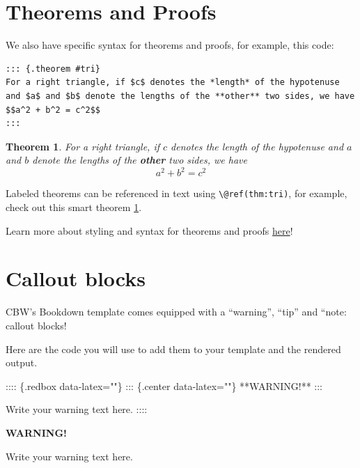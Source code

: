 \documentclass[
]{book}
\newenvironment{Shaded}{\begin{snugshade}}{\end{snugshade}}
\newcommand{\NormalTok}[1]{#1}
\newenvironment{redbox}{
  \definecolor{shadecolor}{RGB}{243, 154, 157}
  \color{white}
  \begin{shaded}}
 {\end{shaded}}
\newtheorem{theorem}{Theorem}[chapter]
\theoremstyle{definition}
\theoremstyle{definition}
\theoremstyle{definition}
\theoremstyle{definition}
\theoremstyle{remark}
\begin{document}
\section{Theorems and Proofs}\label{theorems-and-proofs}

We also have specific syntax for theorems and proofs, for example, this code:

\begin{verbatim}
::: {.theorem #tri}
For a right triangle, if $c$ denotes the *length* of the hypotenuse
and $a$ and $b$ denote the lengths of the **other** two sides, we have
$$a^2 + b^2 = c^2$$
:::
\end{verbatim}

\begin{theorem}
\protect\hypertarget{thm:tri}{}\label{thm:tri}For a right triangle, if \(c\) denotes the \emph{length} of the hypotenuse and \(a\) and \(b\) denote the lengths of the \textbf{other} two sides, we have \[a^2 + b^2 = c^2\]
\end{theorem}

Labeled theorems can be referenced in text using \texttt{\textbackslash{}@ref(thm:tri)}, for example, check out this smart theorem \ref{thm:tri}.

Learn more about styling and syntax for theorems and proofs \href{https://bookdown.org/yihui/bookdown/markdown-extensions-by-bookdown.html}{here}!

\section{Callout blocks}\label{callout-blocks}

CBW's Bookdown template comes equipped with a ``warning'', ``tip'' and ``note: callout blocks!

Here are the code you will use to add them to your template and the rendered output.

\begin{Shaded}
\begin{Highlighting}[]
\NormalTok{:::: \{.redbox data{-}latex=""\}}
\NormalTok{::: \{.center data{-}latex=""\}}
\NormalTok{**WARNING!**}
\NormalTok{:::}

\NormalTok{Write your warning text here.}
\NormalTok{::::}
\end{Highlighting}
\end{Shaded}

\begin{redbox}

\begin{center}
\textbf{WARNING!}

\end{center}

Write your warning text here.

\end{redbox}
\end{document}
